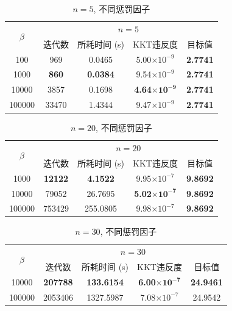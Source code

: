 \documentclass[UTF8,10.5pt,a4paper]{ctexart}
\theoremstyle{definition}
\theoremstyle{definition}
\begin{document}
\begin{table}[htbp]
	\renewcommand{\captionfont}{\small}
    \centering
    \caption{$n=5$, 不同惩罚因子}
    \label{n5beta}
    \vskip 4mm
    \begin{tabular}{c|c|c|c|c}
        \hline
        \multirow{2}{*}{$\beta$} & \multicolumn{4}{c}{$n=5$}\\\cline{2-5}
          & 迭代数 & 所耗时间 (s) & KKT违反度 & 目标值\\\hline
        100 & 969 & 0.0465 & 5.00$\times10^{-9}$ & \textbf{2.7741}\\\hline
        1000 & \textbf{860} & \textbf{0.0384} & 9.54$\times10^{-9}$ & \textbf{2.7741}\\\hline
        10000 & 3857 & 0.1698 & \textbf{4.64$\mathbf{\times10^{-9}}$} & \textbf{2.7741}\\\hline
        100000 & 33470 & 1.4344 & 9.47$\times10^{-9}$ & \textbf{2.7741}\\\hline
    \end{tabular}
\end{table}

\begin{table}[htbp]
    \renewcommand{\captionfont}{\small}
    \centering
    \caption{$n=20$, 不同惩罚因子}
    \label{n20beta}
    \vskip 4mm
    \begin{tabular}{c|c|c|c|c}
        \hline
        \multirow{2}{*}{$\beta$} & \multicolumn{4}{c}{$n=20$}\\\cline{2-5}
          & 迭代数 & 所耗时间 (s) & KKT违反度 & 目标值\\\hline
        1000 & \textbf{12122} & \textbf{4.1522} & 9.95$\times10^{-7}$ & \textbf{9.8692}\\\hline
        10000 & 79052 & 26.7695 & \textbf{5.02$\mathbf{\times10^{-7}}$} & \textbf{9.8692}\\\hline
        100000 & 753429 & 255.0805 & 9.98$\times10^{-7}$ & \textbf{9.8692}\\\hline
    \end{tabular}
\end{table}

\begin{table}[htbp]
	\renewcommand{\captionfont}{\small}
    \centering
    \caption{$n=30$, 不同惩罚因子}
    \label{n30beta}
    \vskip 4mm
    \begin{tabular}{c|c|c|c|c}
        \hline
        \multirow{2}{*}{$\beta$} & \multicolumn{4}{c}{$n=30$}\\\cline{2-5}
          & 迭代数 & 所耗时间 (s) & KKT违反度 & 目标值\\\hline
        10000 & \textbf{207788} & \textbf{133.6154} & \textbf{6.00$\mathbf{\times10^{-7}}$} & \textbf{24.9461}\\\hline
        100000 & 2053406 & 1327.5987 & 7.08$\times10^{-7}$ & 24.9542\\\hline
    \end{tabular}
\end{table}
\end{document}
